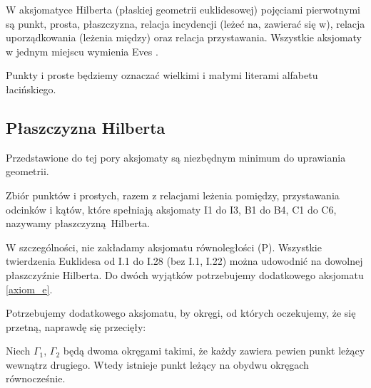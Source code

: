 %

W aksjomatyce Hilberta (płaskiej geometrii euklidesowej) pojęciami pierwotnymi są punkt, prosta, płaszczyzna, relacja incydencji (leżeć na, zawierać się w), relacja uporządkowania (leżenia między) oraz relacja przystawania.
Wszystkie aksjomaty w jednym miejscu wymienia Eves \cite[s. 380-382]{eves1_1972}.

Punkty i proste będziemy oznaczać wielkimi i małymi literami alfabetu łacińskiego.

%

%

%

%

%


%

\subsection{Płaszczyzna Hilberta}

Przedstawione do tej pory aksjomaty są niezbędnym minimum do uprawiania geometrii.

\begin{definition}
    Zbiór punktów i prostych, razem z relacjami leżenia pomiędzy, przystawania odcinków i kątów, które spełniają aksjomaty I1 do I3, B1 do B4, C1 do C6, nazywamy płaszczyzną Hilberta.
\end{definition}

W szczególności, nie zakładamy aksjomatu równoległości (P).
Wszystkie twierdzenia Euklidesa od I.1 do I.28 (bez I.1, I.22) można udowodnić na dowolnej płaszczyźnie Hilberta.
Do dwóch wyjątków potrzebujemy dodatkowego aksjomatu \ref{axiom_e}.
%

Potrzebujemy dodatkowego aksjomatu, by okręgi, od których oczekujemy, że się przetną, naprawdę się przecięły:

\begin{axiom}
    \label{axiom_e}
    Niech $\Gamma_1$, $\Gamma_2$ będą dwoma okręgami takimi, że każdy zawiera pewien punkt leżący wewnątrz drugiego.
    Wtedy istnieje punkt leżący na obydwu okręgach równocześnie.
\end{axiom}

